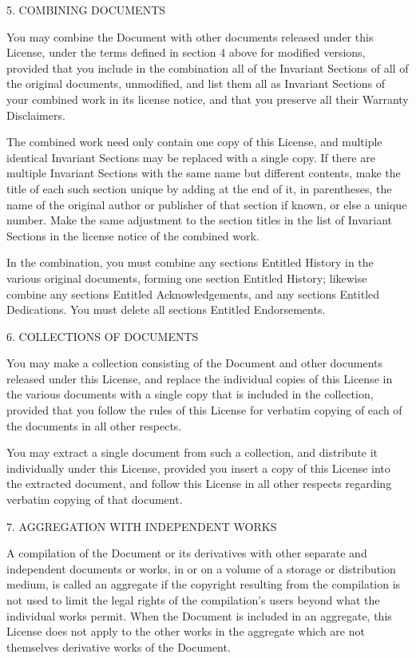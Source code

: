 \begin{noIndex}
5. COMBINING DOCUMENTS 

You may combine the Document with other documents released under this
License, under the terms defined in section 4 above for modified
versions, provided that you include in the combination all of the
Invariant Sections of all of the original documents, unmodified, and
list them all as Invariant Sections of your combined work in its
license notice, and that you preserve all their Warranty Disclaimers.

The combined work need only contain one copy of this License, and
multiple identical Invariant Sections may be replaced with a single
copy. If there are multiple Invariant Sections with the same name but
different contents, make the title of each such section unique by
adding at the end of it, in parentheses, the name of the original
author or publisher of that section if known, or else a unique
number. Make the same adjustment to the section titles in the list of
Invariant Sections in the license notice of the combined work.

In the combination, you must combine any sections Entitled
{\textquotedbl}History{\textquotedbl} in the various original
documents, forming one section Entitled
{\textquotedbl}History{\textquotedbl}; likewise combine any sections
Entitled {\textquotedbl}Acknowledgements{\textquotedbl}, and any
sections Entitled {\textquotedbl}Dedications{\textquotedbl}.  You must
delete all sections Entitled
{\textquotedbl}Endorsements.{\textquotedbl}


6. COLLECTIONS OF DOCUMENTS 

You may make a collection consisting of the Document and other
documents released under this License, and replace the individual
copies of this License in the various documents with a single copy
that is included in the collection, provided that you follow the rules
of this License for verbatim copying of each of the documents in all
other respects.

You may extract a single document from such a collection, and
distribute it individually under this License, provided you insert a
copy of this License into the extracted document, and follow this
License in all other respects regarding verbatim copying of that
document.


7. AGGREGATION WITH INDEPENDENT WORKS 

A compilation of the Document or its derivatives with other separate
and independent documents or works, in or on a volume of a storage or
distribution medium, is called an
{\textquotedbl}aggregate{\textquotedbl} if the copyright resulting
from the compilation is not used to limit the legal rights of the
compilation's users beyond what the individual works permit. When the
Document is included in an aggregate, this License does not apply to
the other works in the aggregate which are not themselves derivative
works of the Document.


\end{noIndex}
